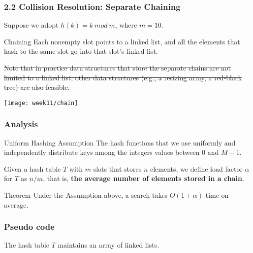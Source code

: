 \documentclass[aspectratio=169, 14pt]{beamer}
\begin{document}
\begin{frame}
	\frametitle{2.2 Collision Resolution: Separate Chaining}
	Suppose we adopt $h(k) = k \ mod \ m$, where $m = 10$.

	\begin{exampleblock}{Chaining}
		Each nonempty slot points to a linked list, and all the elements that hash to the same slot go into that slot's linked list.
	\end{exampleblock}

	\sout{Note that in practice data structures that store the separate chains are not limited to a linked list, other data structures (e.g., a resizing array, a red-black tree) are also feasible.}
\end{frame}

\begin{frame}
	\texttt{[image: week11/chain]}
\end{frame}

\begin{frame}
	\frametitle{Analysis}

	\begin{exampleblock}{Uniform Hashing Assumption}
		The hash functions that we use uniformly and independently distribute keys among the integers values between $0$ and $M - 1$.
	\end{exampleblock}

	Given a hash table $T$ with $m$ slots that stores $n$ elements, we define \alert{load factor} $\alpha$ for $T$ as $n/m$, that is, \textbf{the average number of elements stored in a chain}.

	\begin{exampleblock}{Theorem}
		Under the Assumption above, a search takes $O(1+\alpha)$ time on average.
	\end{exampleblock}
\end{frame}

\begin{frame}[fragile]
	\frametitle{Pseudo code}
	The hash table $T$ maintains an array of linked lists.



\end{frame}
\end{document}
